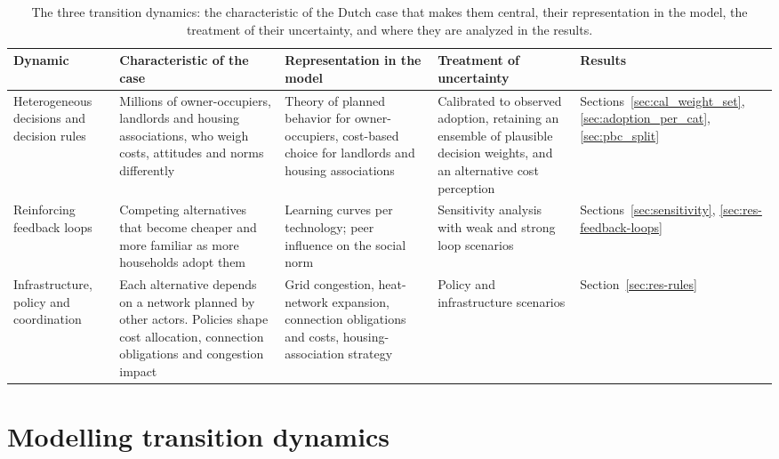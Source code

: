 \documentclass[preprint,12pt,authoryear]{elsarticle}
\begin{document}
\begin{table}[htbp]
  \centering
  \caption{The three transition dynamics: the characteristic of the Dutch
  case that makes them central, their representation in the model, the
  treatment of their uncertainty, and where they are analyzed in the
  results.}
  \label{tab:dynamics}
  \footnotesize
  \setlength{\tabcolsep}{4pt}
  \begin{tabular}{@{}L{2.1cm} L{3.1cm} L{3.3cm} L{3.3cm} L{1.9cm}@{}}
    \toprule
    \textbf{Dynamic} & \textbf{Characteristic of the case} &
    \textbf{Representation in the model} & \textbf{Treatment of uncertainty}
    & \textbf{Results}\\
    \midrule
    Heterogeneous decisions and decision rules & Millions of owner-occupiers,
    landlords and housing associations, who weigh costs, attitudes and norms
    differently & Theory of planned behavior for owner-occupiers, cost-based
    choice for landlords and housing associations & Calibrated to observed
    adoption, retaining an ensemble of plausible decision weights, and an
    alternative cost perception & Sections~\ref{sec:cal_weight_set},
    \ref{sec:adoption_per_cat}, \ref{sec:pbc_split}\\
    \addlinespace
    Reinforcing feedback loops & Competing alternatives that become cheaper
    and more familiar as more households adopt them & Learning curves per
    technology; peer influence on the social norm & Sensitivity analysis
    with weak and strong loop scenarios & Sections~\ref{sec:sensitivity},
    \ref{sec:res-feedback-loops}\\
    \addlinespace
    Infrastructure, policy and coordination & Each alternative depends on a
    network planned by other actors. Policies shape cost allocation, 
    connection obligations and congestion impact & Grid congestion, 
    heat-network expansion, connection obligations and costs, 
    housing-association strategy & Policy
    and infrastructure scenarios & Section~\ref{sec:res-rules}\\
    \bottomrule
  \end{tabular}
\end{table}

\section{Modelling transition dynamics}
\label{method}
\end{document}
